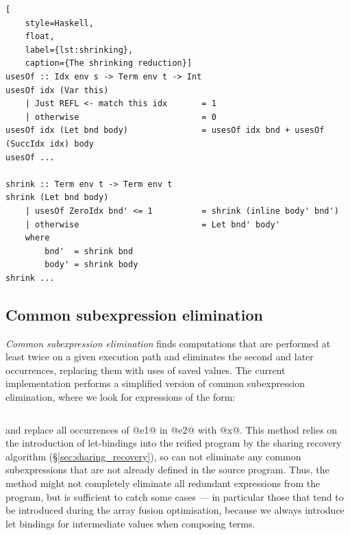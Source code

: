 
\begin{lstlisting}[
    style=Haskell,
    float,
    label={lst:shrinking},
    caption={The shrinking reduction}]
usesOf :: Idx env s -> Term env t -> Int
usesOf idx (Var this)
    | Just REFL <- match this idx       = 1
    | otherwise                         = 0
usesOf idx (Let bnd body)               = usesOf idx bnd + usesOf (SuccIdx idx) body
usesOf ...

shrink :: Term env t -> Term env t
shrink (Let bnd body)
    | usesOf ZeroIdx bnd' <= 1          = shrink (inline body' bnd')
    | otherwise                         = Let bnd' body'
    where
        bnd'  = shrink bnd
        body' = shrink body
shrink ...
\end{lstlisting}


\subsection{Common subexpression elimination}
\label{sec:cse}

\emph{Common subexpression elimination} finds computations that are performed at
least twice on a given execution path and eliminates the second and later
occurrences, replacing them with uses of saved values. The current
implementation performs a simplified version of common subexpression
elimination, where we look for expressions of the form:
%
\begin{lstlisting}[style=Haskell,numbers=none]
%\bf$\langle$ common subexpression elimination $\rangle$% let x = e1 in [x/e1]e2
\end{lstlisting}
%
and replace all occurrences of @e1@ in @e2@ with @x@. This method relies on the
introduction of let-bindings into the reified program by the sharing recovery
algorithm (\S\ref{sec:sharing_recovery}), so can not eliminate any common
subexpressions that are not already defined in the source program. Thus, the
method might not completely eliminate all redundant expressions from the
program, but is sufficient to catch some cases --- in particular those that tend
to be introduced during the array fusion optimisation, because we always
introduce let bindings for intermediate values when composing terms.

